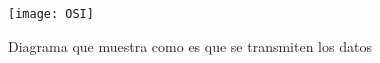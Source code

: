 \begin{figure}[!ht]
\centering
\texttt{[image: OSI]}
\caption{Diagrama que muestra como es que se transmiten los datos}
\end{figure}
\pagebreak



